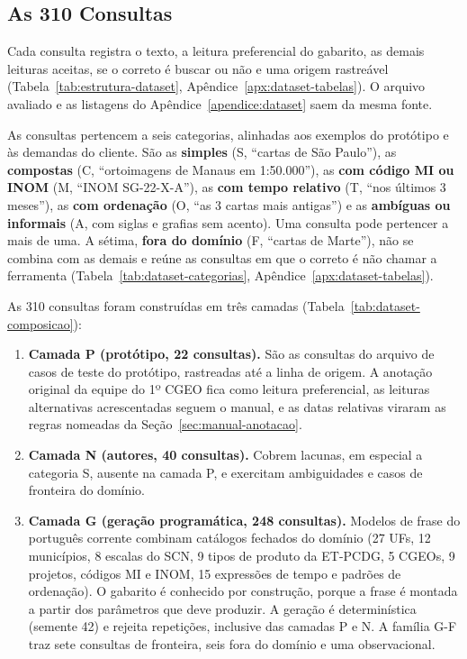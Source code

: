 \subsection{As 310 Consultas}
\label{sec:camadas}

Cada consulta registra o texto, a leitura preferencial do gabarito, as demais leituras aceitas, se o correto é buscar ou não e uma origem rastreável (Tabela~\ref{tab:estrutura-dataset}, Apêndice~\ref{apx:dataset-tabelas}). O arquivo avaliado e as listagens do Apêndice~\ref{apendice:dataset} saem da mesma fonte.

As consultas pertencem a seis categorias, alinhadas aos exemplos do protótipo e às demandas do cliente. São as \textbf{simples} (S, ``cartas de São Paulo''), as \textbf{compostas} (C, ``ortoimagens de Manaus em 1:50.000''), as \textbf{com código MI ou INOM} (M, ``INOM SG-22-X-A''), as \textbf{com tempo relativo} (T, ``nos últimos 3 meses''), as \textbf{com ordenação} (O, ``as 3 cartas mais antigas'') e as \textbf{ambíguas ou informais} (A, com siglas e grafias sem acento). Uma consulta pode pertencer a mais de uma. A sétima, \textbf{fora do domínio} (F, ``cartas de Marte''), não se combina com as demais e reúne as consultas em que o correto é não chamar a ferramenta (Tabela~\ref{tab:dataset-categorias}, Apêndice~\ref{apx:dataset-tabelas}).

As 310 consultas foram construídas em três camadas (Tabela~\ref{tab:dataset-composicao}):
\begin{enumerate}
  \item \textbf{Camada P (protótipo, 22 consultas).} São as consultas do arquivo de casos de teste do protótipo, rastreadas até a linha de origem. A anotação original da equipe do 1º CGEO fica como leitura preferencial, as leituras alternativas acrescentadas seguem o manual, e as datas relativas viraram as regras nomeadas da Seção~\ref{sec:manual-anotacao}.
  \item \textbf{Camada N (autores, 40 consultas).} Cobrem lacunas, em especial a categoria S, ausente na camada P, e exercitam ambiguidades e casos de fronteira do domínio.
  \item \textbf{Camada G (geração programática, 248 consultas).} Modelos de frase do português corrente combinam catálogos fechados do domínio (27 UFs, 12 municípios, 8 escalas do SCN, 9 tipos de produto da ET-PCDG, 5 CGEOs, 9 projetos, códigos MI e INOM, 15 expressões de tempo e padrões de ordenação). O gabarito é conhecido por construção, porque a frase é montada a partir dos parâmetros que deve produzir. A geração é determinística (semente 42) e rejeita repetições, inclusive das camadas P e N. A família G-F traz sete consultas de fronteira, seis fora do domínio e uma observacional.
\end{enumerate}

